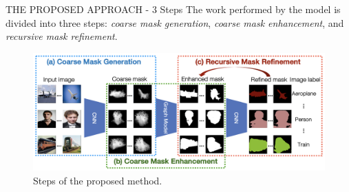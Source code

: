 \begin{frame}{THE PROPOSED APPROACH - 3 Steps}
    The work performed by the model is divided into three steps: \emph{coarse mask generation}, \emph{coarse mask enhancement}, and \emph{recursive mask refinement}.
    \begin{figure}[h!]
        \centering
        \includegraphics[width = 1 \linewidth]{images/paper6/step.png}
        \centering
        \caption{Steps of the proposed method.}
    \end{figure}
\end{frame}

